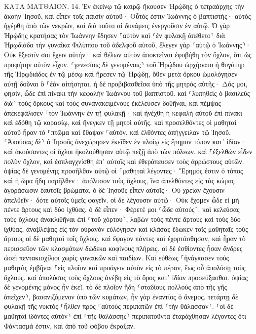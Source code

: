 \documentclass[twoside, 9pt]{extreport}
\begin{document}
ΚΑΤΑ ΜΑΤΘΑΙΟΝ.
14.
Ἐν ἐκείνῳ τῷ καιρῷ ἤκουσεν Ἡρῴδης ὁ τετραάρχης τὴν ἀκοὴν Ἰησοῦ, 
καὶ εἶπεν τοῖς παισὶν αὐτοῦ· Οὗτός ἐστιν Ἰωάννης ὁ βαπτιστής· αὐτὸς ἠγέρθη ἀπὸ τῶν νεκρῶν, καὶ διὰ τοῦτο αἱ δυνάμεις ἐνεργοῦσιν ἐν αὐτῷ. 
Ὁ γὰρ Ἡρῴδης κρατήσας τὸν Ἰωάννην ἔδησεν ⸀αὐτὸν καὶ ⸂ἐν φυλακῇ ἀπέθετο⸃ διὰ Ἡρῳδιάδα τὴν γυναῖκα Φιλίππου τοῦ ἀδελφοῦ αὐτοῦ, 
ἔλεγεν γὰρ ⸂αὐτῷ ὁ Ἰωάννης⸃· Οὐκ ἔξεστίν σοι ἔχειν αὐτήν· 
καὶ θέλων αὐτὸν ἀποκτεῖναι ἐφοβήθη τὸν ὄχλον, ὅτι ὡς προφήτην αὐτὸν εἶχον. 
⸂γενεσίοις δὲ γενομένοις⸃ τοῦ Ἡρῴδου ὠρχήσατο ἡ θυγάτηρ τῆς Ἡρῳδιάδος ἐν τῷ μέσῳ καὶ ἤρεσεν τῷ Ἡρῴδῃ, 
ὅθεν μετὰ ὅρκου ὡμολόγησεν αὐτῇ δοῦναι ὃ ⸀ἐὰν αἰτήσηται. 
ἡ δὲ προβιβασθεῖσα ὑπὸ τῆς μητρὸς αὐτῆς· Δός μοι, φησίν, ὧδε ἐπὶ πίνακι τὴν κεφαλὴν Ἰωάννου τοῦ βαπτιστοῦ. 
καὶ ⸂λυπηθεὶς ὁ βασιλεὺς διὰ⸃ τοὺς ὅρκους καὶ τοὺς συνανακειμένους ἐκέλευσεν δοθῆναι, 
καὶ πέμψας ἀπεκεφάλισεν ⸀τὸν Ἰωάννην ἐν τῇ φυλακῇ· 
καὶ ἠνέχθη ἡ κεφαλὴ αὐτοῦ ἐπὶ πίνακι καὶ ἐδόθη τῷ κορασίῳ, καὶ ἤνεγκεν τῇ μητρὶ αὐτῆς. 
καὶ προσελθόντες οἱ μαθηταὶ αὐτοῦ ἦραν τὸ ⸀πτῶμα καὶ ἔθαψαν ⸀αὐτόν, καὶ ἐλθόντες ἀπήγγειλαν τῷ Ἰησοῦ. 
⸂Ἀκούσας δὲ⸃ ὁ Ἰησοῦς ἀνεχώρησεν ἐκεῖθεν ἐν πλοίῳ εἰς ἔρημον τόπον κατ᾽ ἰδίαν· καὶ ἀκούσαντες οἱ ὄχλοι ἠκολούθησαν αὐτῷ πεζῇ ἀπὸ τῶν πόλεων. 
καὶ ⸀ἐξελθὼν εἶδεν πολὺν ὄχλον, καὶ ἐσπλαγχνίσθη ἐπ᾽ αὐτοῖς καὶ ἐθεράπευσεν τοὺς ἀρρώστους αὐτῶν. 
ὀψίας δὲ γενομένης προσῆλθον αὐτῷ οἱ ⸀μαθηταὶ λέγοντες· Ἔρημός ἐστιν ὁ τόπος καὶ ἡ ὥρα ἤδη παρῆλθεν· ἀπόλυσον τοὺς ὄχλους, ἵνα ἀπελθόντες εἰς τὰς κώμας ἀγοράσωσιν ἑαυτοῖς βρώματα. 
ὁ δὲ Ἰησοῦς εἶπεν αὐτοῖς· Οὐ χρείαν ἔχουσιν ἀπελθεῖν· δότε αὐτοῖς ὑμεῖς φαγεῖν. 
οἱ δὲ λέγουσιν αὐτῷ· Οὐκ ἔχομεν ὧδε εἰ μὴ πέντε ἄρτους καὶ δύο ἰχθύας. 
ὁ δὲ εἶπεν· Φέρετέ μοι ⸂ὧδε αὐτούς⸃. 
καὶ κελεύσας τοὺς ὄχλους ἀνακλιθῆναι ἐπὶ ⸂τοῦ χόρτου⸃, λαβὼν τοὺς πέντε ἄρτους καὶ τοὺς δύο ἰχθύας, ἀναβλέψας εἰς τὸν οὐρανὸν εὐλόγησεν καὶ κλάσας ἔδωκεν τοῖς μαθηταῖς τοὺς ἄρτους οἱ δὲ μαθηταὶ τοῖς ὄχλοις. 
καὶ ἔφαγον πάντες καὶ ἐχορτάσθησαν, καὶ ἦραν τὸ περισσεῦον τῶν κλασμάτων δώδεκα κοφίνους πλήρεις. 
οἱ δὲ ἐσθίοντες ἦσαν ἄνδρες ὡσεὶ πεντακισχίλιοι χωρὶς γυναικῶν καὶ παιδίων. 
Καὶ εὐθέως ⸀ἠνάγκασεν τοὺς μαθητὰς ἐμβῆναι ⸀εἰς πλοῖον καὶ προάγειν αὐτὸν εἰς τὸ πέραν, ἕως οὗ ἀπολύσῃ τοὺς ὄχλους. 
καὶ ἀπολύσας τοὺς ὄχλους ἀνέβη εἰς τὸ ὄρος κατ᾽ ἰδίαν προσεύξασθαι. ὀψίας δὲ γενομένης μόνος ἦν ἐκεῖ. 
τὸ δὲ πλοῖον ἤδη ⸂σταδίους πολλοὺς ἀπὸ τῆς γῆς ἀπεῖχεν⸃, βασανιζόμενον ὑπὸ τῶν κυμάτων, ἦν γὰρ ἐναντίος ὁ ἄνεμος. 
τετάρτῃ δὲ φυλακῇ τῆς νυκτὸς ⸀ἦλθεν πρὸς ⸀αὐτοὺς περιπατῶν ἐπὶ ⸂τὴν θάλασσαν⸃. 
⸂οἱ δὲ μαθηταὶ ἰδόντες αὐτὸν⸃ ἐπὶ ⸂τῆς θαλάσσης⸃ περιπατοῦντα ἐταράχθησαν λέγοντες ὅτι Φάντασμά ἐστιν, καὶ ἀπὸ τοῦ φόβου ἔκραξαν. 
\end{document}
